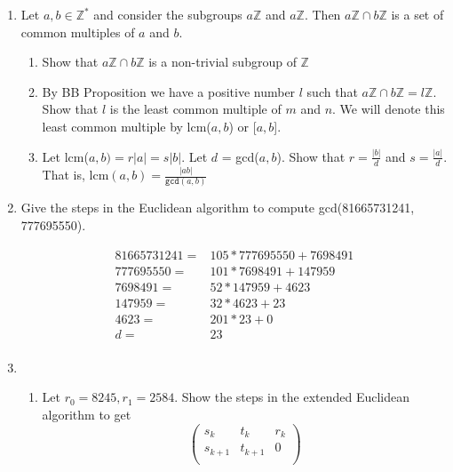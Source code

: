 \documentclass[11pt]{article}
\begin{document}
\begin{enumerate}
\newpage %
\item Let $a, b \in \mathbb{Z}^*$ and consider the subgroups $a\mathbb{Z}$ and $a\mathbb{Z}$.  Then $a\mathbb{Z} \cap b\mathbb{Z}$ is a set of common multiples of $a$ and $b$.
\begin{enumerate}
\item Show that $a\mathbb{Z} \cap b\mathbb{Z}$ is a non-trivial subgroup of $\mathbb{Z}$
\\
\item By BB Proposition we have a positive number $l$ such that $a\mathbb{Z} \cap b\mathbb{Z} = l\mathbb{Z}$.  Show that $l$ is the least common multiple of $m$ and $n$.  We will denote this least common multiple by lcm($a,b$) or [$a,b$].
\\
\item Let lcm($a,b) = r|a| = s|b|$.  Let $d$ = gcd($a,b$).  Show that $r = \tfrac{|b|}{d}$ and $s = \tfrac{|a|}{d}$.  That is, lcm$(a,b) = \tfrac{|ab|}{\mathtt{gcd}(a,b)}$
\end{enumerate}


\newpage %
\item Give the steps in the Euclidean algorithm to compute gcd(81665731241, 777695550).

\begin{align*}
81665731241 =& 105 * 777695550 + 7698491\\
777695550 =& 101 * 7698491 + 147959\\
7698491 =& 52 * 147959 + 4623\\
147959 =& 32 * 4623 + 23\\
4623 =& 201 * 23 + 0\\
d =& 23\\
\end{align*}

\newpage %
\item 
\begin{enumerate}
\item Let $r_0 = 8245, r_1 = 2584$.  Show the steps in the extended Euclidean algorithm to get
\begin{equation*}
\left(
\begin{array}{ccc}
s_k & t_k & r_k \\
s_{k+1} & t_{k+1} & 0 \\
\end{array} \right)
\end{equation*}


\end{enumerate}
\end{enumerate}
\end{document}
